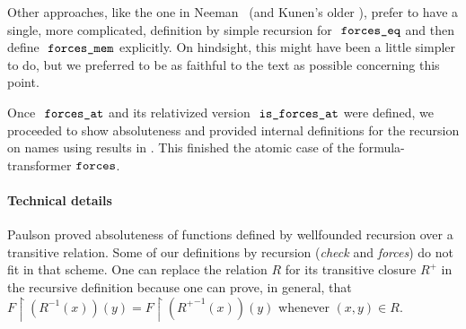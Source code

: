 Other approaches, like the one in Neeman~\cite{neeman-course} (and
Kunen's older \cite{kunen1980}), prefer
to have a single, more complicated, definition by simple recursion for
$\forceseq$ and then define $\forcesmem$ explicitly. On hindsight,
this might have been a little simpler to do, but we preferred to be as
faithful to the text as possible concerning this point.

Once $\forcesat$ and its relativized version $\isatt{is{\isacharunderscore}forces{\isacharunderscore}at}$
were defined, we proceeded to show absoluteness and provided internal
definitions for the recursion on names using results in
. This finished the atomic case of the
formula-transformer $\mathop{\mathtt{forces}}$. 

\paragraph*{Technical details}
Paulson proved absoluteness of functions defined by wellfounded
recursion over a transitive relation. Some of our definitions by
recursion (\emph{check} and \emph{forces}) do not fit in that scheme.
One can replace the relation $R$ for its transitive closure $R^+$ in the
recursive definition because one can prove, in general, that
$F\!\upharpoonright\!(R^{-1}(x))(y) =
F\!\upharpoonright\!({R^+}^{-1}(x))(y)$ whenever $(x,y) \in R$.


